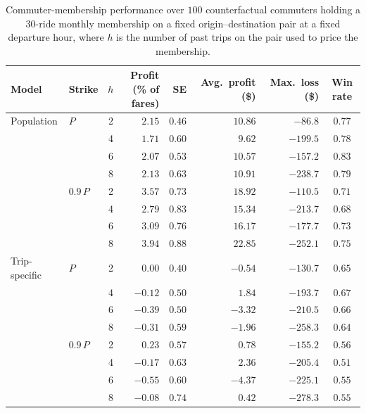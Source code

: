\documentclass[12pt]{article}
\begin{document}
{{{{{{{{\begin{table}[h!]
    \centering
    \caption{Commuter-membership performance over $100$ counterfactual commuters holding a
    $30$-ride monthly membership on a fixed origin--destination pair at a fixed departure hour,
    where $h$ is the number of past trips on the pair used to price the membership.}
    \begin{tabular}{l l c r r r r c}
    \hline
    Model & Strike & $h$ & \shortstack{Profit\\(\% of fares)} & SE &
    \shortstack{Avg.\ profit\\(\$)} & \shortstack{Max.\ loss\\(\$)} & Win rate \\
    \hline
    Population    & $P$ & 2 & $2.15$ & $0.46$ & $10.86$ & $-86.8$  & $0.77$ \\
                  &     & 4 & $1.71$ & $0.60$ & $9.62$  & $-199.5$ & $0.78$ \\
                  &     & 6 & $2.07$ & $0.53$ & $10.57$ & $-157.2$ & $0.83$ \\
                  &     & 8 & $2.13$ & $0.63$ & $10.91$ & $-238.7$ & $0.79$ \\
    \cline{2-8}
                  & $0.9\,P$ & 2 & $3.57$ & $0.73$ & $18.92$ & $-110.5$ & $0.71$ \\
                  &          & 4 & $2.79$ & $0.83$ & $15.34$ & $-213.7$ & $0.68$ \\
                  &          & 6 & $3.09$ & $0.76$ & $16.17$ & $-177.7$ & $0.73$ \\
                  &          & 8 & $3.94$ & $0.88$ & $22.85$ & $-252.1$ & $0.75$ \\
    \hline
    Trip-specific & $P$ & 2 & $0.00$  & $0.40$ & $-0.54$ & $-130.7$ & $0.65$ \\
                  &     & 4 & $-0.12$ & $0.50$ & $1.84$  & $-193.7$ & $0.67$ \\
                  &     & 6 & $-0.39$ & $0.50$ & $-3.32$ & $-210.5$ & $0.66$ \\
                  &     & 8 & $-0.31$ & $0.59$ & $-1.96$ & $-258.3$ & $0.64$ \\
    \cline{2-8}
                  & $0.9\,P$ & 2 & $0.23$  & $0.57$ & $0.78$  & $-155.2$ & $0.56$ \\
                  &          & 4 & $-0.17$ & $0.63$ & $2.36$  & $-205.4$ & $0.51$ \\
                  &          & 6 & $-0.55$ & $0.60$ & $-4.37$ & $-225.1$ & $0.55$ \\
                  &          & 8 & $-0.08$ & $0.74$ & $0.42$  & $-278.3$ & $0.55$ \\
    \hline
    \end{tabular}
    \label{tab:commuter-metrics}
\end{table}

}}}}}}}}
\end{document}
